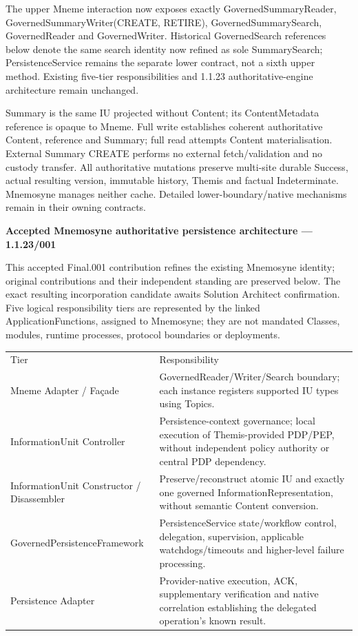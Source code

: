 The upper Mneme interaction now exposes exactly GovernedSummaryReader, GovernedSummaryWriter(CREATE, RETIRE), GovernedSummarySearch, GovernedReader and GovernedWriter. Historical GovernedSearch references below denote the same search identity now refined as sole SummarySearch; PersistenceService remains the separate lower contract, not a sixth upper method. Existing five-tier responsibilities and 1.1.23 authoritative-engine architecture remain unchanged.



Summary is the same IU projected without Content; its ContentMetadata reference is opaque to Mneme. Full write establishes coherent authoritative Content, reference and Summary; full read attempts Content materialisation. External Summary CREATE performs no external fetch/validation and no custody transfer. All authoritative mutations preserve multi-site durable Success, actual resulting version, immutable history, Themis and factual Indeterminate. Mnemosyne manages neither cache. Detailed lower-boundary/native mechanisms remain in their owning contracts.



\par\medskip\textbf{Accepted Mnemosyne authoritative persistence architecture — 1.1.23/001}\par


This accepted Final.001 contribution refines the existing Mnemosyne identity; original contributions and their independent standing are preserved below. The exact resulting incorporation candidate awaits Solution Architect confirmation. Five logical responsibility tiers are represented by the linked ApplicationFunctions, assigned to Mnemosyne; they are not mandated Classes, modules, runtime processes, protocol boundaries or deployments.



\begin{longtable}{>{\raggedright\arraybackslash}p{}>{\raggedright\arraybackslash}p{}}
Tier & Responsibility \\
Mneme Adapter / Façade & GovernedReader/Writer/Search boundary; each instance registers supported IU types using Topics. \\
InformationUnit Controller & Persistence-context governance; local execution of Themis-provided PDP/PEP, without independent policy authority or central PDP dependency. \\
InformationUnit Constructor / Disassembler & Preserve/reconstruct atomic IU and exactly one governed InformationRepresentation, without semantic Content conversion. \\
GovernedPersistenceFramework & PersistenceService state/workflow control, delegation, supervision, applicable watchdogs/timeouts and higher-level failure processing. \\
Persistence Adapter & Provider-native execution, ACK, supplementary verification and native correlation establishing the delegated operation’s known result. \\
\end{longtable}


